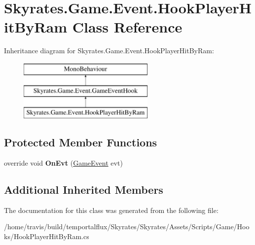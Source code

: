 \hypertarget{class_skyrates_1_1_game_1_1_event_1_1_hook_player_hit_by_ram}{\section{Skyrates.\-Game.\-Event.\-Hook\-Player\-Hit\-By\-Ram Class Reference}
\label{class_skyrates_1_1_game_1_1_event_1_1_hook_player_hit_by_ram}
}
Inheritance diagram for Skyrates.\-Game.\-Event.\-Hook\-Player\-Hit\-By\-Ram\-:\begin{figure}[H]
\begin{center}
\leavevmode
\includegraphics[height=3.000000cm]{class_skyrates_1_1_game_1_1_event_1_1_hook_player_hit_by_ram}
\end{center}
\end{figure}
\subsection*{Protected Member Functions}
\begin{DoxyCompactItemize}
\item 
\hypertarget{class_skyrates_1_1_game_1_1_event_1_1_hook_player_hit_by_ram_afc9761eb52e46fa3d900c1e251c0ba33}{override void {\bfseries On\-Evt} (\hyperlink{class_skyrates_1_1_game_1_1_event_1_1_game_event}{Game\-Event} evt)}\label{class_skyrates_1_1_game_1_1_event_1_1_hook_player_hit_by_ram_afc9761eb52e46fa3d900c1e251c0ba33}

\end{DoxyCompactItemize}
\subsection*{Additional Inherited Members}


The documentation for this class was generated from the following file\-:\begin{DoxyCompactItemize}
\item 
/home/travis/build/temportalflux/\-Skyrates/\-Skyrates/\-Assets/\-Scripts/\-Game/\-Hooks/Hook\-Player\-Hit\-By\-Ram.\-cs\end{DoxyCompactItemize}
